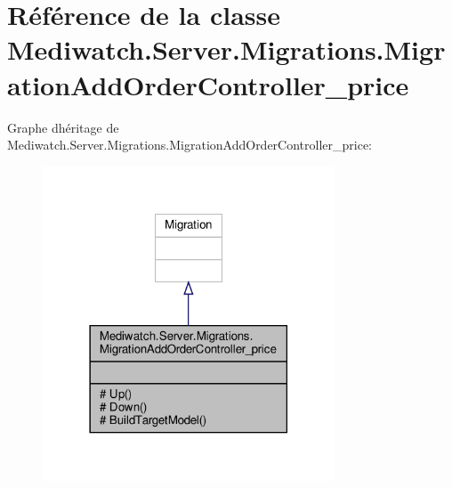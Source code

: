 \hypertarget{class_mediwatch_1_1_server_1_1_migrations_1_1_migration_add_order_controller__price}{}\section{Référence de la classe Mediwatch.\+Server.\+Migrations.\+Migration\+Add\+Order\+Controller\+\_\+price}
\label{class_mediwatch_1_1_server_1_1_migrations_1_1_migration_add_order_controller__price}


Graphe d\textquotesingle{}héritage de Mediwatch.\+Server.\+Migrations.\+Migration\+Add\+Order\+Controller\+\_\+price\+:\nopagebreak
\begin{figure}[H]
\begin{center}
\leavevmode
\includegraphics[width=246pt]{class_mediwatch_1_1_server_1_1_migrations_1_1_migration_add_order_controller__price__inherit__graph}
\end{center}
\end{figure}


